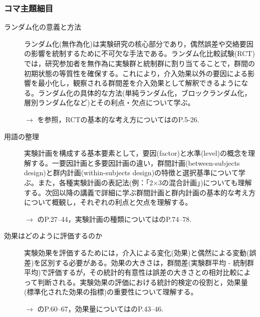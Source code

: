\subsubsection{コマ主題細目}
\begin{description}

	\item[ランダム化の意義と方法] ランダム化(無作為化)は実験研究の核心部分であり，偶然誤差や交絡要因の影響を統制するために不可欠な手法である。ランダム化比較試験(RCT)では，研究参加者を無作為に実験群と統制群に割り当てることで，群間の初期状態の等質性を確保する。これにより，介入効果以外の要因による影響を最小化し，観察される群間差を介入効果として解釈できるようになる。ランダム化の具体的な方法(単純ランダム化，ブロックランダム化，層別ランダム化など)とその利点・欠点について学ぶ。
	      \begin{flushright}
		      $\to$ \textcite{Yasui2019}を参照，RCTの基本的な考え方については\textcite{Toyoda201706}のP.5-26.
	      \end{flushright}

	\item[用語の整理] 実験計画を構成する基本要素として，要因(factor)と水準(level)の概念を理解する。一要因計画と多要因計画の違い，群間計画(between-subjects design)と群内計画(within-subjects design)の特徴と選択基準について学ぶ。また，各種実験計画の表記法(例：「2$\times$3の混合計画」)についても理解する。次回以降の講義で詳細に学ぶ群間計画と群内計画の基本的な考え方について概観し，それぞれの利点と欠点を理解する。
	      \begin{flushright}
		      $\to$ \textcite{Toyoda201706}のP.27--44，実験計画の種類については\textcite{kosugi2018}のP.74--78.
	      \end{flushright}

	\item[効果はどのように評価するのか] 実験効果を評価するためには，介入による変化(効果)と偶然による変動(誤差)を区別する必要がある。効果の大きさは，群間差(実験群平均 - 統制群平均)で評価するが，その統計的有意性は誤差の大きさとの相対比較によって判断される。実験効果の評価における統計的検定の役割と，効果量(標準化された効果の指標)の重要性について理解する。
	      \begin{flushright}
		      $\to$ \textcite{kosugi2018}のP.60--67，効果量については\textcite{Matia201201}のP.43--46.
	      \end{flushright}


\end{description}
